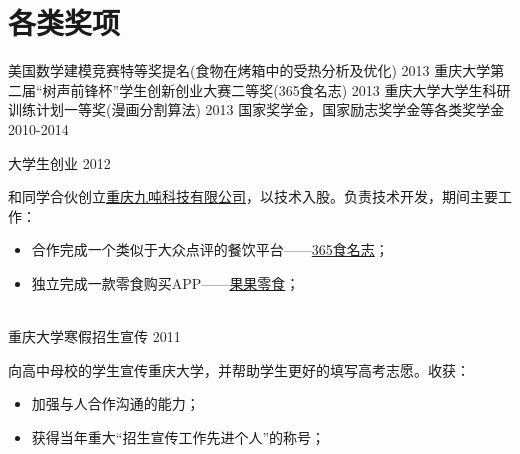 \documentclass[]{friggeri-cv_cn} %
\begin{document}
\section{各类奖项}

\begin{entrylist}
\entryac
{美国数学建模竞赛特等奖提名(食物在烤箱中的受热分析及优化)}
{2013}
\entryac
{重庆大学第二届“树声前锋杯”学生创新创业大赛二等奖(365食名志)}
{2013}
\entryac
{重庆大学大学生科研训练计划一等奖(漫画分割算法)}
{2013}
\entryac
{国家奖学金，国家励志奖学金等各类奖学金}
{2010-2014}

\end{entrylist}
\begin{entrylist}
\entry
{大学生创业}
{2012}
{和同学合伙创立\href{http://nineton.cn/}{重庆九吨科技有限公司}，以技术入股。负责技术开发，期间主要工作：
\begin{itemize}
\item 合作完成一个类似于大众点评的餐饮平台------\href{http://nineton.cn/product.php?id=17}{365食名志}；
\item 独立完成一款零食购买APP------\href{http://apk.gfan.com/Product/App584080.html}{果果零食}；
\end{itemize}
}
\\
\entryend
{重庆大学寒假招生宣传}
{2011}
{向高中母校的学生宣传重庆大学，并帮助学生更好的填写高考志愿。收获：
\begin{itemize}
    \item 加强与人合作沟通的能力；
    \item 获得当年重大“招生宣传工作先进个人”的称号；
\end{itemize}
}
\end{entrylist}
\end{document}
